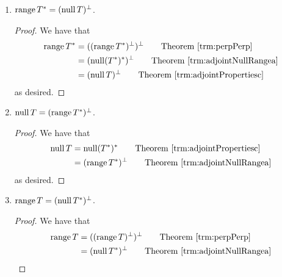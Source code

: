\documentclass[../main.tex]{subfiles}
\begin{document}
\begin{itemize}
\begin{theorem}
\begin{enumerate}[label={\textup{(}\alph*\textup{)}},ref={\thetheorem\alph*}]
            \begin{proof}
                Let $w\in W$ be an arbitrary element of $\nul T^*$. Then $T^*w=0$ by definition. It follows by Theorem \ref{trm:inpPropertiesc} that $\inp{v}{T^*w}=0$ for all $v\in V$. Thus, by the definition of the adjoint, $\inp{Tv}{w}=0$ for all $v\in V$. But this implies that $w$ is orthogonal to every vector in $\range T$ (i.e., the set of all $Tv$), meaning that $w\in(\range T)^\perp$.\par
                The proof is symmetric in the other direction.
            \end{proof}
            \item \label{trm:adjointNullRangeb}$\operatorname{range} T^*=(\operatorname{null} T)^\perp$.
            \begin{proof}
                We have that
                \begin{align*}
                    \range T^* &= ((\range T^*)^\perp)^\perp\tag*{Theorem \ref{trm:perpPerp}}\\
                    &= (\nul(T^*)^*)^\perp\tag*{Theorem \ref{trm:adjointNullRangea}}\\
                    &= (\nul T)^\perp\tag*{Theorem \ref{trm:adjointPropertiesc}}
                \end{align*}
                as desired.
            \end{proof}
            \item \label{trm:adjointNullRangec}$\operatorname{null} T=(\operatorname{range} T^*)^\perp$.
            \begin{proof}
                We have that
                \begin{align*}
                    \nul T &= \nul(T^*)^*\tag*{Theorem \ref{trm:adjointPropertiesc}}\\
                    &= (\range T^*)^\perp\tag*{Theorem \ref{trm:adjointNullRangea}}
                \end{align*}
                as desired.
            \end{proof}
            \item \label{trm:adjointNullRanged}$\operatorname{range} T=(\operatorname{null} T^*)^\perp$.
            \begin{proof}
                We have that
                \begin{align*}
                    \range T &= ((\range T)^\perp)^\perp\tag*{Theorem \ref{trm:perpPerp}}\\
                    &= (\nul T^*)^\perp\tag*{Theorem \ref{trm:adjointNullRangea}}
                \end{align*}

\end{proof}
\end{enumerate}
\end{theorem}
\end{itemize}
\end{document}
